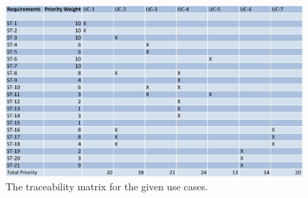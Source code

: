 \begin{figure}
\centering
\includegraphics[width=5.5in]{./img/traceability.png}
\caption{The traceability matrix for the given use cases.}
\end{figure}

